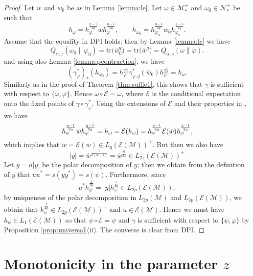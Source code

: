 \documentclass[12pt]{article}
\theoremstyle{definition}
\theoremstyle{remark}
\numberwithin{equation}{section}
\def\cE{\mathcal E}
\def\Me{\mathcal M}
\def\Ne{\mathcal N}
\def\Tr{\mathrm{tr}}
\def\ffi{\varphi}
\begin{document}
\begin{proof} Let $\bar w$ and $\bar w_0$ be as in Lemma \ref{lemma:le}. Let $\omega\in
\Me_*^+$ and $\omega_0\in \Ne_*^+$ be such that
{\color{red}\[
h_\omega=h_\ffi^{\frac{q-1}{2q}}\bar wh_\ffi^{\frac{q-1}{2q}},\qquad
h_{\omega_0}=h_{\ffi_0}^{\frac{q-1}{2q}}\bar w_0h_{\ffi_0}^{\frac{q-1}{2q}}.
\]}
 Assume that the equality in DPI holds; then by Lemma
\ref{lemma:le} we have
\[
Q_{\alpha,z}(\omega_0\|\varphi_0)=\Tr\bigl(\bar w_0^q\bigr)=\Tr\bigl(\bar
w^q\bigr)=Q_{\alpha,z}(\omega\|\varphi).
\]
and using also Lemma \ref{lemma:pcontraction}, we have
\[
(\gamma^*_\ffi)_*(h_{\omega_0})=h_\ffi^{\frac1{2\alpha}}\gamma^*_{\ffi,q}(\bar
w_0)h_\ffi^{\frac1{2\alpha}}=h_\omega.
\]
Similarly as in the proof of {\color{red}Theorem \ref{thm:suffle1},} this shows that $\gamma$ is sufficient
with respect to $\{\omega,\ffi\}$. Hence $\omega\circ \cE=\omega$, where $\cE$ is the
conditional expectation onto the fixed points of $\gamma\circ\gamma^*_\ffi$.  Using the
extensions of $\cE$ and their properties {\color{red}in \cite{junge2003noncommutative}, we have}
\[
h_\varphi^{q-1\over2q}\bar
wh_\varphi^{q-1\over 2q}=h_\omega=\cE(h_\omega)=h_\varphi^{q-1\over 2q}\cE(\bar
w)h_\varphi^{q-1\over 2q},
\]
which implies that $\bar w=\cE(\bar w)\in L_q(\cE(\Me))^+$. But then we also have
\[
|y|=\bar w^{\frac1{2(\alpha-1)}}=\bar w^{\frac{q}{2z}}\in L_{2z}(\cE(\Me))^+
\]
Let $y=u|y|$ be the polar decomposition of $y$; then we obtain from the definition of $y$ that
$uu^*=s(yy^*)=s(\psi)$. Furthermore, since
\[
u^*h_\psi^{\frac1{2p}}=|y|h_\varphi^{\frac1{2q}}\in L_{2p}(\cE(\Me)),
\]
by uniqueness of the polar decomposition in $L_{2p}(\Me)$ and $L_{2p}(\cE(\Me))$, we
obtain that $h_{\psi}^{\frac1{2p}}\in L_{2p}(\cE(\Me))^+$ and $u\in \cE(\Me)$. Hence we must
have $h_\psi\in L_1(\cE(\Me))$ so that $\psi\circ\cE=\psi$ and $\gamma$ is sufficient with
respect to $\{\psi,\ffi\}$ by Proposition \ref{prop:universal}(ii). The converse is clear from DPI.
\end{proof}


\section{Monotonicity in the parameter $z$}
\end{document}
